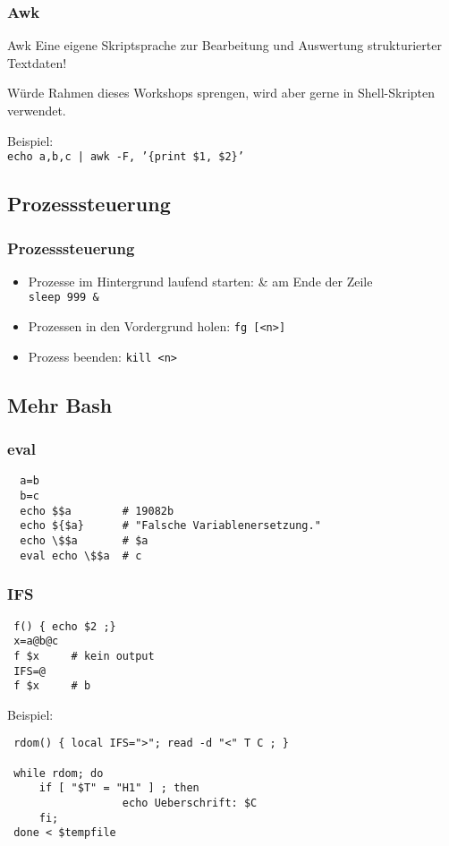\documentclass{beamer}
\begin{document}
\begin{frame}
 \frametitle{Awk}
 \begin{block}{Awk}
  Eine eigene Skriptsprache zur Bearbeitung und Auswertung strukturierter Textdaten!
 \end{block}

  Würde Rahmen dieses Workshops sprengen, wird aber gerne in Shell-Skripten verwendet. 
  \bigskip
  
  Beispiel: \\  
  {\tt echo a,b,c | awk -F, '\{print \$1, \$2\}' }
\end{frame}

\subsection{Prozesssteuerung}
\begin{frame}
 \frametitle{Prozesssteuerung}
 \begin{itemize}
  \item Prozesse im Hintergrund laufend starten: \& am Ende der Zeile \\
    {\tt sleep 999 \& }
  \item Prozessen in den Vordergrund holen: {\tt fg [<n>] }
  \item Prozess beenden: {\tt kill <n>}
 \end{itemize}
\end{frame}

\subsection{Mehr Bash}
\begin{frame}[fragile]
 \frametitle{eval}
 \begin{lstlisting}
  a=b
  b=c
  echo $$a        # 19082b
  echo ${$a}      # "Falsche Variablenersetzung."
  echo \$$a       # $a
  eval echo \$$a  # c 
 \end{lstlisting}
\end{frame}

\begin{frame}[fragile]
 \frametitle{IFS}
 \begin{lstlisting}
 f() { echo $2 ;}
 x=a@b@c
 f $x     # kein output
 IFS=@
 f $x     # b
 \end{lstlisting}
 
 Beispiel:
 \begin{lstlisting} 
 rdom() { local IFS=">"; read -d "<" T C ; }
 
 while rdom; do
     if [ "$T" = "H1" ] ; then
                  echo Ueberschrift: $C
     fi;
 done < $tempfile
 \end{lstlisting}

 
\end{frame}
\end{document}
